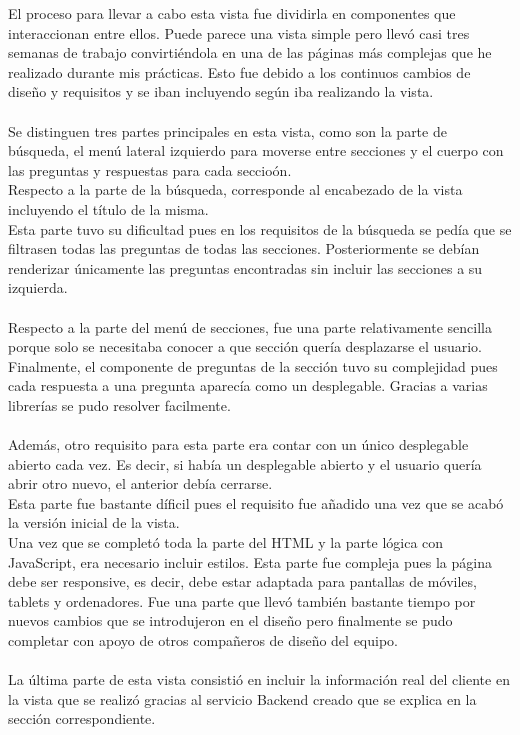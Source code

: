 \documentclass[a4paper,12pt]{article}
\begin{document}
\begin{itemize}
\begin{itemize}
        El proceso para llevar a cabo esta vista fue dividirla en componentes que interaccionan entre ellos. Puede parece una vista simple pero llevó casi tres semanas de trabajo convirtiéndola en una de las páginas más complejas que he realizado durante mis prácticas. Esto fue debido a los continuos cambios de diseño y requisitos y se iban incluyendo según iba realizando la vista.\\
        \\Se distinguen tres partes principales en esta vista, como son la parte de búsqueda, el menú lateral izquierdo para moverse entre secciones y el cuerpo con las preguntas y respuestas para cada seccioón.\\
        Respecto a la parte de la búsqueda, corresponde al encabezado de la vista incluyendo el título de la misma. \\
        Esta parte tuvo su dificultad pues en los requisitos de la búsqueda se pedía que se filtrasen todas las preguntas de todas las secciones. Posteriormente se debían renderizar únicamente las preguntas encontradas sin incluir las secciones a su izquierda.\\
        \\Respecto a la parte del menú de secciones, fue una parte relativamente sencilla porque solo se necesitaba conocer a que sección quería desplazarse el usuario.
        Finalmente, el componente de preguntas de la sección tuvo su complejidad pues cada respuesta a una pregunta aparecía como un desplegable. Gracias a varias librerías se pudo resolver facilmente.\\
        \\
        Además, otro requisito para esta parte era contar con un único desplegable abierto cada vez. Es decir, si había un desplegable abierto y el usuario quería abrir otro nuevo, el anterior debía cerrarse.\\
        Esta parte fue bastante díficil pues el requisito fue añadido una vez que se acabó la versión inicial de la vista.\\
        
        Una vez que se completó toda la parte del HTML y la parte lógica con JavaScript, era necesario incluir estilos. Esta parte fue compleja pues la página debe ser responsive, es decir, debe estar adaptada para pantallas de móviles, tablets y ordenadores. Fue una parte que llevó también bastante tiempo por nuevos cambios que se introdujeron en el diseño pero finalmente se pudo completar con apoyo de otros compañeros de diseño del equipo.\\
        \\
        La última parte de esta vista consistió en incluir la información real del cliente en la vista que se realizó gracias al servicio Backend creado que se explica en la sección correspondiente.
        

\end{itemize}
\end{itemize}
\end{document}
